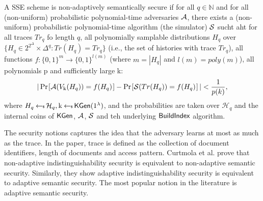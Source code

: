 \begin{definition}
	\normalfont
	A SSE scheme is non-adaptively semantically secure if for all $q \in \mathbb{N}$ and for all (non-uniform) probabilistic polynomial-time adversaries $\mathcal{A}$, there exists a (non-uniform) probabilistic polynomial-time algorithm (the simulator) $\mathcal{S}$ sucht aht for all traces $Tr_q$ fo length $q$, all polynomially samplable distributions $H_q$ over $\{ H_q \in 2^{2^\Delta} \times \Delta^q: Tr(H_q) = Tr_q \}$ (i.e., the set of histories with trace $Tr_q$), all functions $f: \{0,1\}^m \rightarrow \{0,1\}^{l(m)}$ (where $m = |H_q|$ and $l(m) = poly(m)$), all polynomials p and sufficiently large k:
	\begin{equation*}
		| \prob{\adversary(V_\key(H_q)) = f(H_q)} - \prob{\simer(Tr(H_q)) = f(H_q)} | < \frac{1}{p(k)},
	\end{equation*}
	where $H_q \hskip2.3pt{\gets\!\!\mbox{\tiny${\$}$\normalsize}}\, \mathcal{H}_q, \text{k} \hskip2.3pt{\gets\!\!\mbox{\tiny${\$}$\normalsize}}\, \mathsf{KGen}(1^{\lambda})$, and the probabilities are taken over $\mathcal{H}_q$ and the internal coins of $\mathsf{KGen}$, $\mathcal{A}$, $\mathcal{S}$ and teh underlying $\textsf{BuildIndex}$ algorithm.
\end{definition}

The security notions captures the idea that the adversary learns at most as much as the trace. In the paper, trace is defined as the collection of document identifiers, length of documents and access pattern. Curtmola et al. prove that non-adaptive indistinguishability security is equivalent to non-adaptive semantic security. Similarly, they show adaptive indistinguishability security is equivalent to adaptive semantic security. The most popular notion in the literature is adaptive semantic security.

